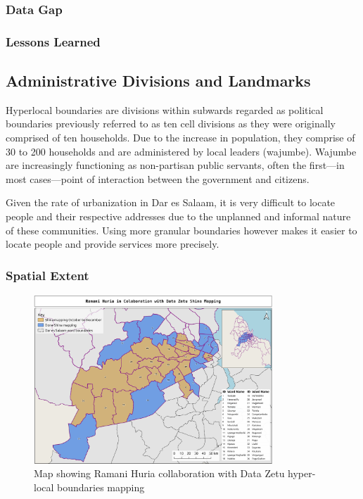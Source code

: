 \documentclass[a4paper,12pt,twoside]{article}
\begin{document}
\subsubsection{Data Gap}

\subsubsection{Lessons Learned}

\newpage
\subsection{Administrative Divisions and Landmarks}
Hyperlocal boundaries are divisions within subwards regarded as political boundaries previously referred to as ten cell divisions as they were originally comprised of ten households.
Due to the increase in population, they comprise of 30 to 200 households and are administered by local leaders (wajumbe). Wajumbe are increasingly functioning as non-partisan public servants, often the first---in most cases---point of interaction between the government and citizens.

Given the rate of urbanization in Dar es Salaam, it is very difficult to locate people and their respective addresses due to the unplanned and informal nature of these communities. Using more granular boundaries however makes it easier to locate people and provide services more precisely. 

\subsubsection{Spatial Extent}
\begin{figure}[h]
  \color{RHgreen}\caption{Map showing Ramani Huria collaboration with Data Zetu hyper-local boundaries mapping}
  \centering
  \includegraphics[width=0.8\textwidth]{images/RH_DZ_shina_boundaries.png}
\end{figure}
\end{document}
